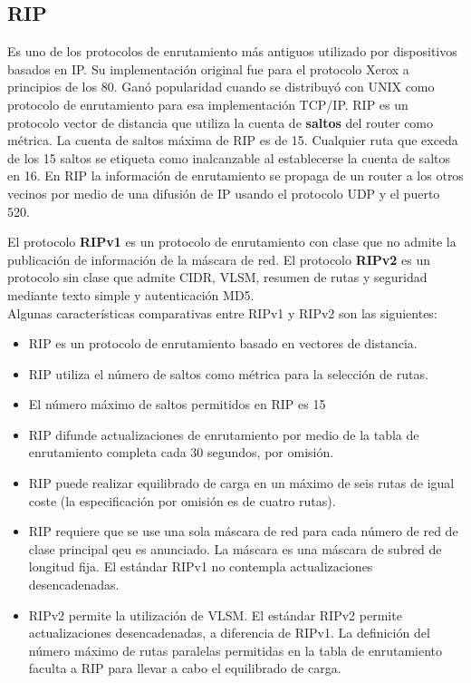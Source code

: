 \documentclass[12pt]{article}
\begin{document}
 \subsection{RIP}
 Es uno de los protocolos de enrutamiento más antiguos utilizado por dispositivos basados en IP. Su implementación original fue para el protocolo Xerox a principios de los 80. Ganó popularidad cuando se distribuyó con UNIX como protocolo de enrutamiento para esa implementación TCP/IP. RIP es un protocolo vector de distancia que utiliza la cuenta de \textbf{saltos} del router como métrica. La cuenta de saltos máxima de RIP es de 15. Cualquier ruta que exceda de los 15 saltos se etiqueta como inalcanzable al establecerse la cuenta de saltos en 16. En RIP la información de enrutamiento se propaga de un router a los otros vecinos por medio de una difusión de IP usando el protocolo UDP y el puerto 520.

El protocolo \textbf{RIPv1} es un protocolo de enrutamiento con clase que no admite la publicación de información de la máscara de red. El protocolo \textbf{RIPv2} es un protocolo sin clase que admite CIDR, VLSM, resumen de rutas y seguridad mediante texto simple y autenticación MD5.
\\
Algunas características comparativas entre RIPv1 y RIPv2 son las siguientes:
\begin{itemize}
\item RIP es un protocolo de enrutamiento basado en vectores de distancia.
\item RIP utiliza el número de saltos como métrica para la selección de rutas.
\item El número máximo de saltos permitidos en RIP es 15
\item RIP difunde actualizaciones de enrutamiento por medio de la tabla de enrutamiento completa cada 30 segundos, por omisión.
\item RIP puede realizar equilibrado de carga en un máximo de seis rutas de igual coste (la especificación por omisión es de cuatro rutas).
\item RIP requiere que se use una sola máscara de red para cada número de red de clase principal qeu es anunciado. La máscara es una máscara de subred de longitud fija. El estándar RIPv1 no contempla actualizaciones desencadenadas.
\item RIPv2 permite la utilización de VLSM. El estándar RIPv2 permite actualizaciones desencadenadas, a diferencia de RIPv1. La definición del número máximo de rutas paralelas permitidas en la tabla de enrutamiento faculta a RIP para llevar a cabo el equilibrado de carga.
\end{itemize}
\end{document}
